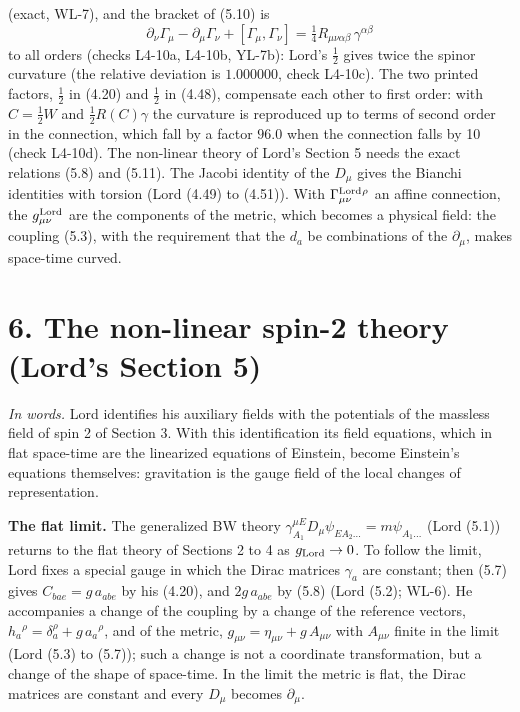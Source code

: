 \documentclass[
  10pt,
]{article}
\begin{document}
(exact, WL-7), and the bracket of (5.10) is
\[\partial_\nu\Gamma_\mu-\partial_\mu\Gamma_\nu+[\Gamma_\mu,\Gamma_\nu]=\tfrac14R_{\mu\nu\alpha\beta}\,\gamma^{\alpha\beta}\tag{5.11}\]
to all orders (checks L4-10a, L4-10b, YL-7b): Lord's \(\tfrac12\) gives
twice the spinor curvature (the relative deviation is \(1.000000\),
check L4-10c). The two printed factors, \(\tfrac12\) in (4.20) and
\(\tfrac12\) in (4.48), compensate each other to first order: with
\(C=\tfrac12W\) and \(\tfrac12R(C)\gamma\) the curvature is reproduced
up to terms of second order in the connection, which fall by a factor
\(96.0\) when the connection falls by 10 (check L4-10d). The non-linear
theory of Lord's Section 5 needs the exact relations (5.8) and (5.11).
The Jacobi identity of the \(D_\mu\) gives the Bianchi identities with
torsion (Lord (4.49) to (4.51)). With
\(\Gamma^{\rm Lord}_{\mu\nu}{}^\rho\) an affine connection, the
\(g^{\rm Lord}_{\mu\nu}\) are the components of the metric, which
becomes a physical field: the coupling (5.3), with the requirement that
the \(d_a\) be combinations of the \(\partial_\mu\), makes space-time
curved.

\hypertarget{the-non-linear-spin-2-theory-lords-section-5}{%
\section{6. The non-linear spin-2 theory (Lord's Section
5)}\label{the-non-linear-spin-2-theory-lords-section-5}}

\emph{In words.} Lord identifies his auxiliary fields with the
potentials of the massless field of spin 2 of Section 3. With this
identification its field equations, which in flat space-time are the
linearized equations of Einstein, become Einstein's equations
themselves: gravitation is the gauge field of the local changes of
representation.

\textbf{The flat limit.} The generalized BW theory
\(\gamma^{\mu E}_{A_1}D_\mu\psi_{EA_2\dots}=m\psi_{A_1\dots}\) (Lord
(5.1)) returns to the flat theory of Sections 2 to 4 as
\(g_{\rm Lord}\to0\). To follow the limit, Lord fixes a special gauge in
which the Dirac matrices \(\gamma_a\) are constant; then (5.7) gives
\(C_{bae}=g\,a_{abe}\) by his (4.20), and \(2g\,a_{abe}\) by (5.8) (Lord
(5.2); WL-6). He accompanies a change of the coupling by a change of the
reference vectors, \(h_a{}^\rho=\delta_a^\rho+g\,a_a{}^\rho\), and of
the metric, \(g_{\mu\nu}=\eta_{\mu\nu}+g\,A_{\mu\nu}\) with
\(A_{\mu\nu}\) finite in the limit (Lord (5.3) to (5.7)); such a change
is not a coordinate transformation, but a change of the shape of
space-time. In the limit the metric is flat, the Dirac matrices are
constant and every \(D_\mu\) becomes \(\partial_\mu\).
\end{document}
